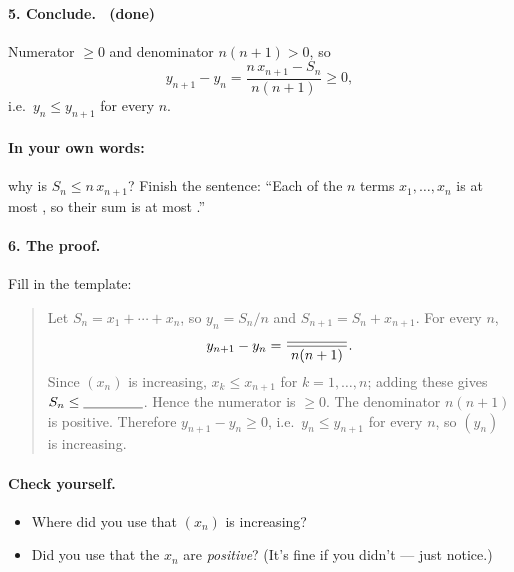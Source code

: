 \documentclass[11pt]{article}
\newcommand{\blank}{\underline{\hspace{1.5cm}}}
\begin{document}
\paragraph{5. Conclude. \checkmark\ (done)} Numerator $\ge 0$ and
denominator $n(n+1)>0$, so
\[
  y_{n+1}-y_n = \frac{n\,x_{n+1} - S_n}{n(n+1)} \ge 0,
\]
i.e.\ $y_n \le y_{n+1}$ for every $n$.

\paragraph{In your own words:} why is $S_n \le n\,x_{n+1}$? Finish the
sentence: ``Each of the $n$ terms $x_1,\ldots,x_n$ is at most \blank,
so their sum is at most \blank.''

\paragraph{6. The proof.} Fill in the template:
\begin{quote}
Let $S_n = x_1+\cdots+x_n$, so $y_n = S_n/n$ and
$S_{n+1} = S_n + x_{n+1}$. For every $n$,
\[
  y_{n+1}-y_n = \frac{\blank}{n(n+1)} .
\]
Since $(x_n)$ is increasing, $x_k \le x_{n+1}$ for $k=1,\ldots,n$;
adding these gives $S_n \le \blank$. Hence the numerator is $\ge 0$.
The denominator $n(n+1)$ is positive. Therefore
$y_{n+1}-y_n \ge 0$, i.e.\ $y_n \le y_{n+1}$ for every $n$, so $(y_n)$
is increasing.
\end{quote}

\paragraph{Check yourself.}
\begin{itemize}
  \item Where did you use that $(x_n)$ is increasing?
  \item Did you use that the $x_n$ are \emph{positive}? (It's fine if
        you didn't --- just notice.)
\end{itemize}
\end{document}
